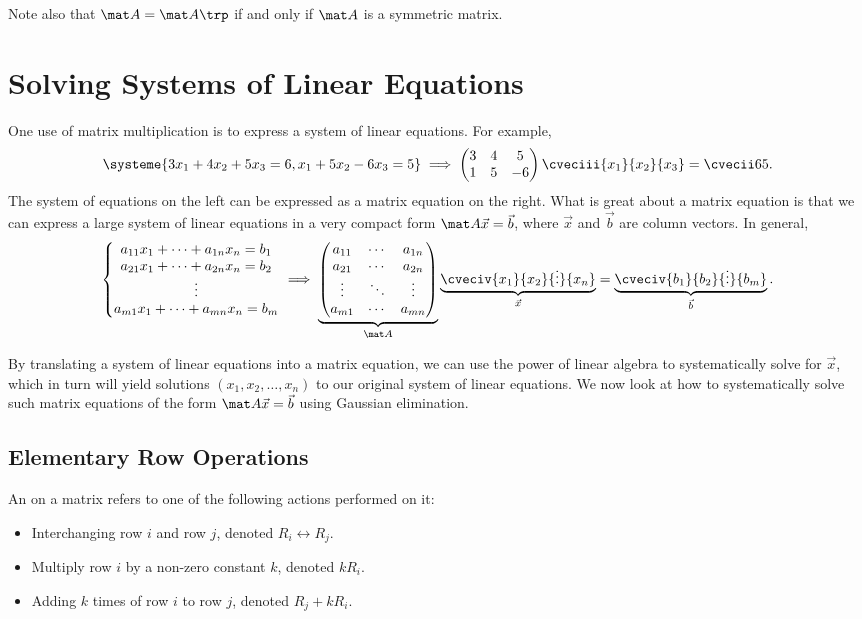 Note also that $\mat A = \mat A \trp$ if and only if $\mat A$ is a symmetric matrix.

\section{Solving Systems of Linear Equations}

One use of matrix multiplication is to express a system of linear equations. For example, \[\systeme{3x_1 + 4x_2 + 5x_3 = 6, x_1 + 5x_2 - 6x_3 = 5} \implies \begin{pmatrix}3 & 4 & 5 \\ 1 & 5 & -6\end{pmatrix} \cveciii{x_1}{x_2}{x_3} = \cvecii65.\] The system of equations on the left can be expressed as a matrix equation on the right. What is great about a matrix equation is that we can express a large system of linear equations in a very compact form $\mat A \vec x = \vec b$, where $\vec x$ and $\vec b$ are column vectors. In general, \[\left\{ \begin{matrix}a_{11} x_1 + \dots + a_{1n} x_n = b_1 \\ a_{21} x_1 + \dots + a_{2n} x_n = b_2 \\ \vdots \\ a_{m1} x_1 + \dots + a_{mn} x_n = b_m \end{matrix} \right. \implies \underbrace{\begin{pmatrix}a_{11} & \cdots & a_{1n} \\ a_{21} & \cdots & a_{2n} \\ \vdots & \ddots & \vdots \\ a_{m1} & \cdots & a_{mn} \end{pmatrix}}_{\mat A} \underbrace{\cveciv{x_1}{x_2}{\vdots}{x_n}}_{\vec x} = \underbrace{\cveciv{b_1}{b_2}{\vdots}{b_m}}_{\vec b}.\]

By translating a system of linear equations into a matrix equation, we can use the power of linear algebra to systematically solve for $\vec x$, which in turn will yield solutions $(x_1, x_2, \dots, x_n)$ to our original system of linear equations. We now look at how to systematically solve such matrix equations of the form $\mat A \vec x = \vec b$ using Gaussian elimination.

\subsection{Elementary Row Operations}

\begin{definition}
    An  on a matrix refers to one of the following actions performed on it:
    \begin{itemize}
        \item Interchanging row $i$ and row $j$, denoted $R_i \leftrightarrow R_j$.
        \item Multiply row $i$ by a non-zero constant $k$, denoted $k R_i$.
        \item Adding $k$ times of row $i$ to row $j$, denoted $R_j + k R_i$.
    \end{itemize}
\end{definition}

